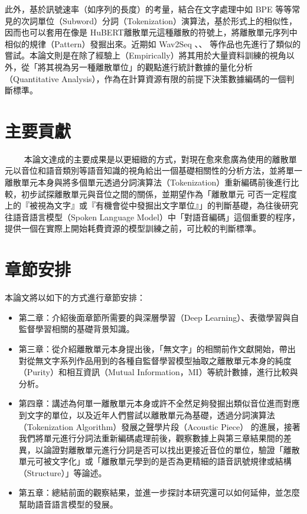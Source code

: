 此外，基於訊號速率（如序列的長度）的考量，結合在文字處理中如 BPE 等等常見的次詞單位（Subword）分詞（Tokenization）演算法，基於形式上的相似性，因而也可以套用在像是 HuBERT離散單元這種離散的符號上，將離散單元序列中相似的規律（Pattern）發掘出來。近期如 Wav2Seq \cite{wu2023wav2seq}、\cite{DBLP:conf/interspeech/Ren00ZW22}、\cite{chang2024exploring} 等作品也先進行了類似的嘗試。本論文則是在除了經驗上（Empirically）將其用於大量資料訓練的視角以外，從「將其視為另一種離散單位」的觀點進行統計數據的量化分析（Quantitative Analysis），作為在計算資源有限的前提下決策數據編碼的一個判斷標準。

\section{主要貢獻}
　　
本論文達成的主要成果是以更細緻的方式，對現在愈來愈廣為使用的離散單元以音位和語音類別等語音知識的視角給出一個基礎相關性的分析方法，並將單一離散單元本身與將多個單元透過分詞演算法（Tokenization）重新編碼前後進行比較，初步試探離散單元與音位之間的關係，並期望作為「離散單元 可否一定程度上的『被視為文字』或『有機會從中發掘出文字單位』」的判斷基礎，為往後研究往語音語言模型（Spoken Language Model）中「對語音編碼」這個重要的程序，提供一個在實際上開始耗費資源的模型訓練之前，可比較的判斷標準。

\section{章節安排}

本論文將以如下的方式進行章節安排：

\begin{itemize}
  \itemsep -2pt %
  \item  第二章：介紹後面章節所需要的與深層學習（Deep Learning）、表徵學習與自監督學習相關的基礎背景知識。
  \item  第三章：從介紹離散單元本身提出後，「無文字」的相關前作文獻開始，帶出對從無文字系列作品用到的各種自監督學習模型抽取之離散單元本身的純度（Purity）和相互資訊（Mutual Information，MI）等統計數據，進行比較與分析。
  \item  第四章：講述為何單一離散單元本身或許不全然足夠發掘出類似音位進而對應到文字的單位，以及近年人們嘗試以離散單元為基礎，透過分詞演算法（Tokenization Algorithm）發展之聲學片段（Acoustic Piece） 的進展，接著我們將單元進行分詞法重新編碼處理前後，觀察數據上與第三章結果間的差異，以論證對離散單元進行分詞是否可以找出更接近音位的單位，驗證「離散單元可被文字化」或「離散單元學到的是否為更精細的語音訊號規律或結構（Structure）」等論述。
  \item  第五章：總結前面的觀察結果，並進一步探討本研究還可以如何延伸，並怎麼幫助語音語言模型的發展。
\end{itemize}
